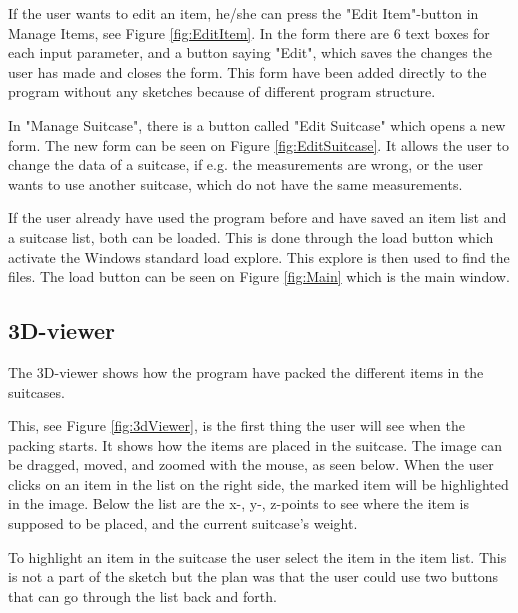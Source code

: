 If the user wants to edit an item, he/she can press the "Edit Item"-button in Manage Items, see Figure \ref{fig:EditItem}. In the form there are 6 text boxes for each input parameter, and a button saying "Edit", which saves the changes the user has made and closes the form. This form have been added directly to the program without any sketches because of different program structure.

In "Manage Suitcase", there is a button called "Edit Suitcase" which opens a new form. The new form can be seen on Figure \ref{fig:EditSuitcase}. It allows the user to change the data of a suitcase, if e.g. the measurements are wrong, or the user wants to use another suitcase, which do not have the same measurements.

If the user already have used the program before and have saved an item list and a suitcase list, both can be loaded. This is done through the load button which activate the Windows standard load explore. This explore is then used to find the files. The load button can be seen on Figure \ref{fig:Main} which is the main window.

\subsection{3D-viewer}
The 3D-viewer shows how the program have packed the different items in the suitcases.


This, see Figure \ref{fig:3dViewer}, is the first thing the user will see when the packing starts. It shows how the items are placed in the suitcase.
The image can be dragged, moved, and zoomed with the mouse, as seen below. When the user clicks on an item in the list on the right side, the marked item will be highlighted in the image. Below the list are the x-, y-, z-points to see where the item is supposed to be placed, and the current suitcase's weight.

To highlight an item in the suitcase the user select the item in the item list. This is not a part of the sketch but the plan was that the user could use two buttons that can go through the list back and forth.


